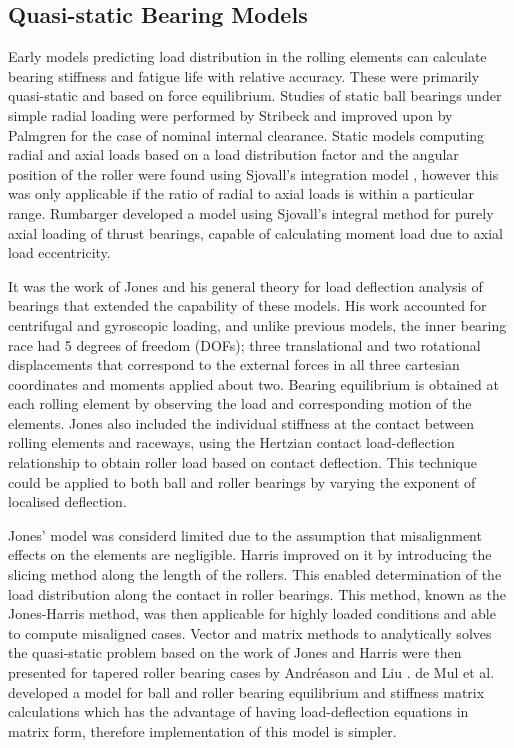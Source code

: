 \subsection{Quasi-static Bearing Models}

Early models predicting load distribution in the rolling elements can calculate bearing stiffness and fatigue life with relative accuracy. These were primarily quasi-static and based on force equilibrium. Studies of static ball bearings under simple radial loading were performed by Stribeck \cite{Stribeck1907} and improved upon by Palmgren \cite{Palmgren1959} for the case of nominal internal clearance. Static models computing radial and axial loads based on a load distribution factor and the angular position of the roller were found using Sjovall’s integration model \cite{Sjovall1933}, however this was only applicable if the ratio of radial to axial loads is within a particular range. Rumbarger \cite{JRumbarger1962} developed a model using Sjovall’s integral method for purely axial loading of thrust bearings, capable of calculating moment load due to axial load eccentricity. 

It was the work of Jones \cite{Jones1960} and his general theory for load deflection analysis of bearings that extended the capability of these models. His work accounted for centrifugal and gyroscopic loading, and unlike previous models, the inner bearing race had 5 degrees of freedom (DOFs); three translational and two rotational displacements that correspond to the external forces in all three cartesian coordinates and moments applied about two. Bearing equilibrium is obtained at each rolling element by observing the load and corresponding motion of the elements. Jones also included the individual stiffness at the contact between rolling elements and raceways, using the Hertzian contact load-deflection relationship to obtain roller load based on contact deflection. This technique could be applied to both ball and roller bearings by varying the exponent of localised deflection. 

Jones' model was considerd limited due to the assumption that misalignment effects on the elements are negligible. Harris \cite{Harris1984} improved on it by introducing the slicing method along the length of the rollers. This enabled determination of the load distribution along the contact in roller bearings. This method, known as the Jones-Harris method, was then applicable for highly loaded conditions and able to compute misaligned cases. Vector and matrix methods to analytically solves the quasi-static problem based on the work of Jones and Harris were then presented for tapered roller bearing cases by Andréason \cite{Andreason1973} and Liu \cite{Liu1976}. de Mul et al. \cite{DeMul1989_2} developed a model for ball and roller bearing equilibrium and stiffness matrix calculations which has the advantage of having load-deflection equations in matrix form, therefore implementation of this model is simpler.


